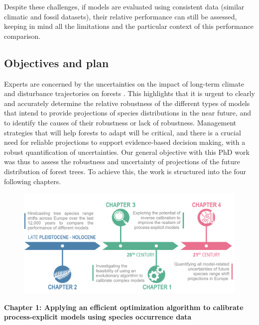 Despite these challenges, if models are evaluated using consistent data (similar climatic and fossil datasets), their relative performance can still be assessed, keeping in mind all the limitations and the particular context of this performance comparison.

\subsection{Objectives and plan}

Experts are concerned by the uncertainties on the impact of long-term climate and disturbance trajectories on forests \citep{Buma2024}. This highlights that it is urgent to clearly and accurately determine the relative robustness of the different types of models that intend to provide projections of species distributions in the near future, and to identify the causes of their robustness or lack of robustness. Management strategies that will help forests to adapt will be critical, and there is a crucial need for reliable projections to support evidence-based decision making, with a robust quantification of uncertainties. Our general objective with this PhD work was thus to assess the robustness and uncertainty of projections of the future distribution of forest trees. To achieve this, the work is structured into the four following chapters. %

\begin{figure}[H]
\vspace*{-0.5cm}
\centering
\includegraphics{0introduction/figs/timeline.pdf}
\vspace*{-5cm}
\label{fig:timeline}
\end{figure}

\clearpage

\textbf{Chapter 1: Applying an efficient optimization algorithm to calibrate process-explicit models using species occurrence data}

